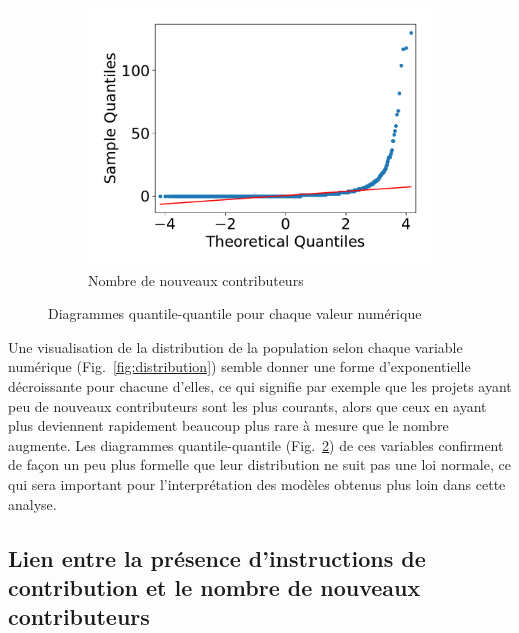 \documentclass[dvipsnames]{llncs}
\begin{document}
\begin{figure}[ht]
\begin{subfigure}[t]{0.3\textwidth}
            \includegraphics[width=\textwidth]{../experiment/data_analysis/newContributorCount_qqplot}
            \caption{Nombre de nouveaux contributeurs}
            \label{sfig:newContributorQQplot}
        \end{subfigure}

        \caption{Diagrammes quantile-quantile pour chaque valeur numérique}
        \label{fig:qqplots}
    \end{figure}

    Une visualisation de la distribution de la population selon chaque variable numérique
    (Fig.~\ref{fig:distribution}) semble donner une forme d'exponentielle décroissante pour chacune d'elles,
    ce qui signifie par exemple que les projets ayant peu de nouveaux contributeurs sont les plus courants,
    alors que ceux en ayant plus deviennent rapidement beaucoup plus rare à mesure que le nombre augmente. Les
    diagrammes quantile-quantile (Fig.~\ref{fig:qqplots}) de ces variables confirment de façon un peu plus
    formelle que leur distribution ne suit pas une loi normale, ce qui sera important pour l'interprétation
    des modèles obtenus plus loin dans cette analyse.

    \subsection{Lien entre la présence d'instructions de contribution et le nombre de nouveaux contributeurs}
\end{document}
